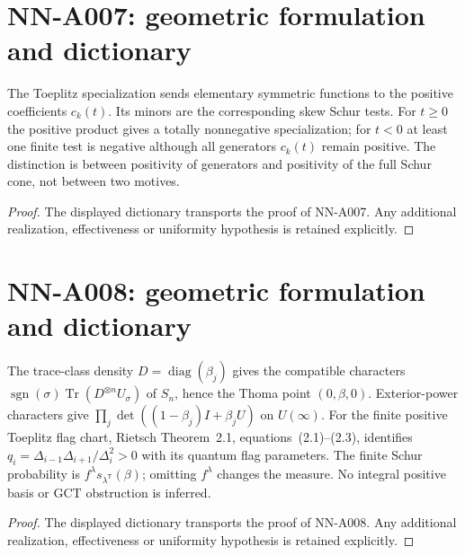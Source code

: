 \section{NN-A007: geometric formulation and dictionary}
\begin{geometricstatement}[NN-A007]
The Toeplitz specialization sends elementary symmetric functions to the positive coefficients $c_k(t)$. Its minors are the corresponding skew Schur tests. For $t\ge0$ the positive product gives a totally nonnegative specialization; for $t<0$ at least one finite test is negative although all generators $c_k(t)$ remain positive. The distinction is between positivity of generators and positivity of the full Schur cone, not between two motives.
\end{geometricstatement}
\begin{proof} The displayed dictionary transports the proof of NN-A007. Any additional realization, effectiveness or uniformity hypothesis is retained explicitly.\end{proof}


\section{NN-A008: geometric formulation and dictionary}
\begin{geometricstatement}[NN-A008]
The trace-class density $D=\operatorname{diag}(\beta_j)$ gives the compatible characters $\operatorname{sgn}(\sigma)\operatorname{Tr}(D^{\otimes n}U_\sigma)$ of $S_n$, hence the Thoma point $(0,\beta,0)$. Exterior-power characters give $\prod_j\det((1-\beta_j)I+\beta_jU)$ on $U(\infty)$. For the finite positive Toeplitz flag chart, Rietsch Theorem~2.1, equations~(2.1)--(2.3), identifies $q_i=\Delta_{i-1}\Delta_{i+1}/\Delta_i^2>0$ with its quantum flag parameters. The finite Schur probability is $f^\lambda s_{\lambda^{\mathsf T}}(\beta)$; omitting $f^\lambda$ changes the measure. No integral positive basis or GCT obstruction is inferred.
\end{geometricstatement}
\begin{proof} The displayed dictionary transports the proof of NN-A008. Any additional realization, effectiveness or uniformity hypothesis is retained explicitly.\end{proof}


